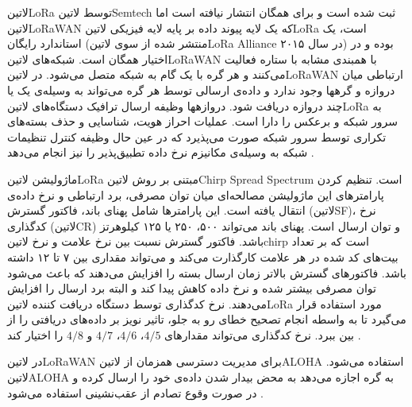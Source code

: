 ‌لاتین{LoRa} توسط ‌لاتین{Semtech} ثبت شده است و برای همگان انتشار نیافته است اما ‌لاتین{LoRaWAN} که یک لایه پیوند داده بر پایه لایه فیزیکی ‌لاتین{LoRa}
است، یک استاندارد رایگان (منتشر شده از سوی ‌لاتین{LoRa Alliance} در سال ۲۰۱۵) بوده و در اختیار همگان است.
شبکه‌های ‌لاتین{LoRaWAN} با همبندی مشابه با ستاره فعالیت می‌کنند و هر گره با یک گام به شبکه متصل می‌شود.
در ‌لاتین{LoRaWAN} ارتباطی میان دروازه و گرهها وجود ندارد و داده‌ی ارسالی توسط هر گره می‌تواند به وسیله‌ی یک یا چند دروازه دریافت شود.
دروازهها وظیفه ارسال ترافیک دستگاه‌های ‌لاتین{LoRa} به سرور شبکه و برعکس را دارا است.
عملیات احراز هویت، شناسایی و حذف بسته‌های تکراری توسط سرور شبکه صورت می‌پذیرد که در عین حال وظیفه کنترل
تنظیمات شبکه به وسیله‌ی مکانیزم نرخ داده تطبیق‌پذیر را نیز انجام می‌دهد .

ماژولیشن ‌لاتین{LoRa} مبتنی بر روش ‌لاتین{Chirp Spread Spectrum} است. تنظیم کردن پارامترهای این ماژولیشن
مصالحه‌ای میان توان مصرفی، برد ارتباطی و نرخ داده‌ی انتقال یافته است.
این پارامترها شامل پهنای باند، فاکتور گسترش (‌لاتین{SF})، نرخ کدگذاری (‌لاتین{CR}) و توان ارسال است.
پهنای باند می‌تواند ۵۰۰، ۲۵۰ یا ۱۲۵ کیلوهرتز باشد.
فاکتور گسترش نسبت بین نرخ علامت و نرخ ‌لاتین{chirp} است که بر تعداد بیت‌های کد شده در هر علامت کارگذارت می‌کند و می‌تواند مقداری بین ۷ تا ۱۲ داشته باشد.
فاکتورهای گسترش بالاتر زمان ارسال بسته را افزایش می‌دهند که باعث می‌شود توان مصرفی بیشتر شده و نرخ داده کاهش پیدا کند و البته برد ارسال را افزایش می‌دهند.
نرخ کدگذاری توسط دستگاه دریافت کننده ‌لاتین{LoRa} مورد استفاده قرار می‌گیرد تا به واسطه انجام تصحیح خطای رو به جلو، تاثیر نویز بر داده‌های دریافتی را از بین ببرد.
نرخ کدگذاری می‌تواند مقدارهای $4/5$، $4/6$، $4/7$ و $4/8$ را اختیار کند
.

در ‌لاتین{LoRaWAN} برای مدیریت دسترسی همزمان از ‌لاتین{ALOHA} استفاده می‌شود.
‌لاتین{ALOHA} به گره اجازه می‌دهد به محض بیدار شدن داده‌ی خود را ارسال کرده و در صورت وقوع تصادم
از عقب‌نشینی استفاده می‌شود
.

